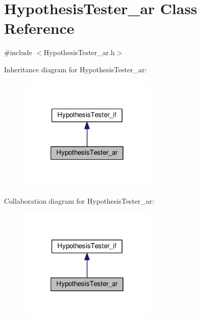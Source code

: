 \hypertarget{class_hypothesis_tester__ar}{\section{Hypothesis\-Tester\-\_\-ar Class Reference}
\label{class_hypothesis_tester__ar}
}


{\ttfamily \#include $<$Hypothesis\-Tester\-\_\-ar.\-h$>$}



Inheritance diagram for Hypothesis\-Tester\-\_\-ar\-:\nopagebreak
\begin{figure}[H]
\begin{center}
\leavevmode
\includegraphics[width=186pt]{class_hypothesis_tester__ar__inherit__graph}
\end{center}
\end{figure}


Collaboration diagram for Hypothesis\-Tester\-\_\-ar\-:\nopagebreak
\begin{figure}[H]
\begin{center}
\leavevmode
\includegraphics[width=186pt]{class_hypothesis_tester__ar__coll__graph}
\end{center}
\end{figure}
